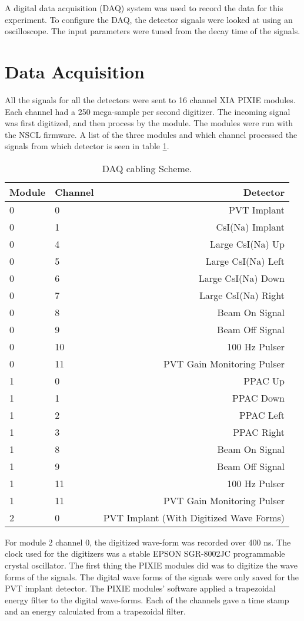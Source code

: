 \documentclass[../MaxHughesThesis.tex]{subfiles}
\begin{document}
A digital data acquisition (DAQ) system was used to record the data for this experiment.
To configure the DAQ, the detector signals were looked at using an oscilloscope.
The input parameters were tuned from the decay time of the signals.

\section{Data Acquisition}

All the signals for all the detectors were sent to 16 channel XIA PIXIE modules. 
Each channel had a 250 mega-sample per second digitizer. 
The incoming signal was first digitized, and then process by the module. 
The modules were run with the NSCL firmware.
A list of the three modules and which channel processed the signals from which detector is seen in table \ref{tab:cablingscheme}.
%
\begin{table}[!hbt]
	\centering
	\caption{DAQ cabling Scheme.}
		\begin{tabular}{llr}
		Module & Channel & Detector \\ \hline
		0 & 0 & PVT Implant \\
		0 & 1 & CsI(Na) Implant \\
		0 & 4 & Large CsI(Na) Up \\
		0 & 5 & Large CsI(Na) Left \\
		0 & 6 & Large CsI(Na) Down \\
		0 & 7 & Large CsI(Na) Right \\
		0 & 8 & Beam On Signal \\
		0 & 9 & Beam Off Signal \\
		0 & 10 & 100 Hz Pulser \\
		0 & 11 & PVT Gain Monitoring Pulser \\
		1 & 0 & PPAC Up \\ 
		1 & 1 & PPAC Down \\ 
		1 & 2 & PPAC Left \\ 
		1 & 3 & PPAC Right \\ 
		1 & 8 & Beam On Signal\\
		1 & 9 & Beam Off Signal\\
		1 & 11 & 100 Hz Pulser \\
		1 & 11 & PVT Gain Monitoring Pulser \\
		2 & 0 & PVT Implant (With Digitized Wave Forms)
		\end{tabular}	
		\label{tab:cablingscheme}
\end{table}
%
For module 2 channel 0, the digitized wave-form was recorded over 400 ns.
The clock used for the digitizers was a stable EPSON SGR-8002JC programmable crystal oscillator.
The first thing the PIXIE modules did was to digitize the wave forms of the signals.
The digital wave forms of the signals were only saved for the PVT implant detector.
The PIXIE modules' software applied a trapezoidal energy filter to the digital wave-forms.
Each of the channels gave a time stamp and an energy calculated from a trapezoidal filter.
\end{document}
